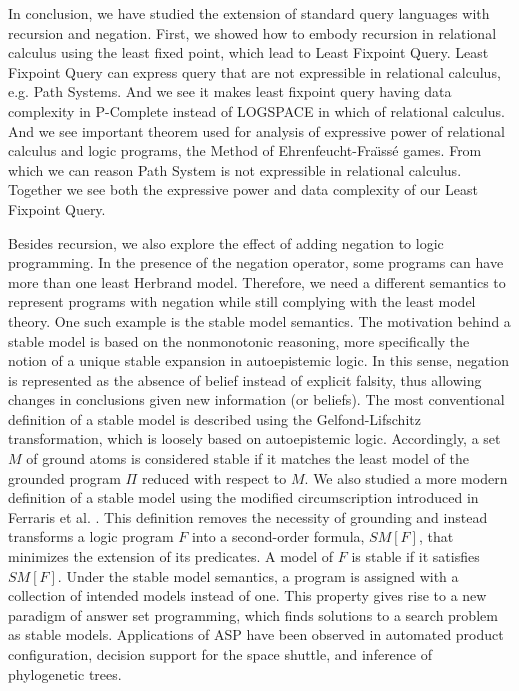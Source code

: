 In conclusion, we have studied the extension of standard query languages with recursion and negation. First, we showed how to embody recursion in relational calculus using the least fixed point, which lead to Least Fixpoint Query. Least Fixpoint Query can express query that are not expressible in relational calculus, e.g.  Path Systems. And we see it makes least fixpoint query having data complexity in P-Complete instead of LOGSPACE in which of relational calculus. And we see important theorem used for analysis of expressive power of relational calculus and logic programs, the Method of Ehrenfeucht-Fra\"ıss\'e games. From which we can reason Path System is not expressible in relational calculus. Together we see both the expressive power and data complexity of our Least Fixpoint Query. 

Besides recursion, we also explore the effect of adding negation 
to logic programming. In the presence of the negation operator, 
some programs can have more than one least Herbrand model. Therefore, 
we need a different semantics to represent programs with negation 
while still complying with the least model theory. One such 
example is the stable model semantics. The motivation behind 
a stable model is based on the nonmonotonic reasoning, more 
specifically the notion of a unique stable expansion in 
autoepistemic logic. In this sense, negation is represented as 
the absence of belief instead of explicit falsity, thus allowing 
changes in conclusions given new information (or beliefs). The 
most conventional definition of a stable model is described 
using the Gelfond-Lifschitz transformation, which is loosely based on 
autoepistemic logic. Accordingly, a set $M$ of ground atoms is considered 
stable if it matches the least model of the grounded program $\Pi$ reduced 
with respect to $M$. We also studied a more modern definition of a stable 
model using the modified circumscription introduced in Ferraris et al. \cite{lee}. 
This definition removes the necessity of grounding and instead transforms 
a logic program $F$ into a second-order formula, $SM[F]$, that minimizes the extension of 
its predicates. A model of $F$ is stable if it satisfies $SM[F]$. 
Under the stable model semantics, a program is assigned with a 
collection of intended models instead of one. This property 
gives rise to a new paradigm of answer set programming, 
which finds solutions to a search problem as stable models. Applications 
of ASP have been observed in automated product configuration, decision 
support for the space shuttle, and inference of phylogenetic trees.